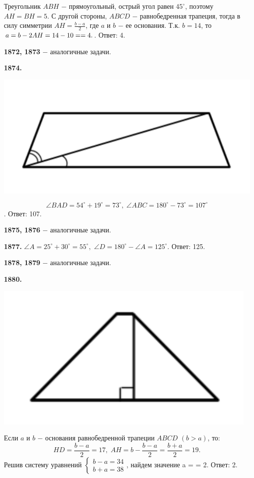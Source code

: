 Треугольник $ABH$ $-$ прямоугольный, острый угол равен $45^\circ$, поэтому $AH = BH = 5$. С другой стороны, $ABCD$ $-$ равнобедренная трапеция, тогда в силу симметрии $AH = \frac{b - a}{2}$, где $a$ и $b$ $-$ ее основания. Т.к. $b = 14$, то $a = b - 2AH = 14 - 10 = \linebreak = 4.$. \newline \null \hspace*{\fill} Ответ: 4.

\textbf{1872, 1873} $-$ аналогичные задачи.

\textbf{1874.}

{\centering \includegraphics[width=0.5\linewidth]{Geometry/Content/21.png}
	
}
\[
\angle BAD = 54^\circ + 19^\circ = 73^\circ, \;\angle ABC = 180^\circ - 73^\circ = 107^\circ
\].\null \hspace*{\fill} Ответ: 107.

\textbf{1875, 1876} $-$ аналогичные задачи.

\textbf{1877.} $\angle A = 25^\circ + 30^\circ = 55^\circ,$ $\angle D = 180^\circ - \angle A = 125^\circ.$ \newline \null \hspace*{\fill} Ответ: 125.

\textbf{1878, 1879} $-$ аналогичные задачи.

\textbf{1880.}

{\centering \includegraphics[width=0.4\linewidth]{Geometry/Content/22.png}
	
}

Если $a$ и $b$ $-$ основания равнобедренной трапеции $ABCD$ $(b > a)$, то:
\[
HD = \frac{b - a}{2} = 17,\; AH = b - \frac{b - a}{2} = \frac{b + a}{2} = 19.
\]
Решив систему уравнений  $\begin{cases} b - a =34 \\ b + a = 38 \end{cases}$, найдем значение a = \linebreak = 2. \newline \null \hspace*{\fill} Ответ: 2.

